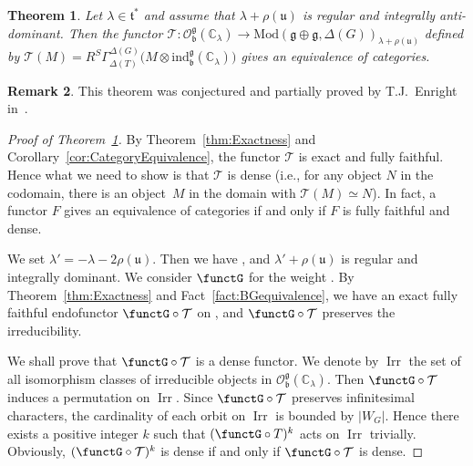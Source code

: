 \documentclass[10pt,a4paper]{amsart}
\numberwithin{equation}{section}
\newtheorem{Theorem}{Theorem}[section]
\theoremstyle{definition}
\newtheorem{Remark}[Theorem]{Remark}
\newcommand{\BasicRing}[1]{\mathbb{#1}}
\newcommand{\CC}{\BasicRing{C}}
\newcommand{\Mod}{\mathrm{Mod}}
\newcommand{\lieC}[1]{\mathfrak{#1}}
\newcommand{\lie}[1]{\mathfrak{#1}}
\newcommand{\ind}[2]{\mathrm{ind}^{\lieC{#1}}_{\lieC{#2}}}
\newcommand{\BGGcat}[2]{\mathcal{O}_{\lie{#2}}^{\lie{#1}}}
\newcommand{\zuck}[2]{\Gamma^{#1}_{#2}}
\newcommand{\Dzuck}[3]{R^{#3}\zuck{#1}{#2}}
\newcommand{\rhog}[1]{\rho(#1)}
\DeclareMathOperator{\Irr}{\mathrm{Irr}}
\begin{document}
\begin{Theorem}\label{thm:CategoryEquivalence}
	Let $\lambda \in \lie{t}^*$ and assume that $\lambda + \rhog{\lie{u}}$ is regular and integrally anti-dominant.
	Then the functor $\mathcal{T}\colon \BGGcat{g}{b}(\CC_{\lambda}) \rightarrow \Mod(\lie{g\oplus g}, \Delta(G))_{\lambda+\rhog{\lie{u}}}$
	defined by $\mathcal{T}(M) = \Dzuck{\Delta(G)}{\Delta(T)}{S}\bigl(M \otimes \ind{g}{b}(\CC_{\lambda})\bigr)$ gives an equivalence of categories.
\end{Theorem}

\begin{Remark}
	This theorem was conjectured and partially proved by T.J.~Enright in~\cite{En81_lecture}.
\end{Remark}

\begin{proof}[Proof of Theorem~\ref{thm:CategoryEquivalence}]
	By Theorem~\ref{thm:Exactness} and Corollary~\ref{cor:CategoryEquivalence}, the functor $\mathcal{T}$ is exact and fully faithful.
	Hence what we need to show is that $\mathcal{T}$ is dense (i.e., for any object $N$ in the codomain,
	there is an object~$M$ in the domain with $\mathcal{T}(M) \simeq N$).
	In fact, a functor $F$ gives an equivalence of categories if and only if $F$ is fully faithful and dense.

	We set $\lambda'=-\lambda-2\rhog{\lie{u}}$.
	Then we have \smash{$\BGGcat{g}{b}(\CC_{-\lambda'})=\BGGcat{g}{b}(\CC_{\lambda})$},
	and $\lambda' + \rhog{\lie{u}}$ is regular and integrally dominant.
	We consider $\functG$ for the weight .
	By Theorem~\ref{thm:Exactness} and Fact~\ref{fact:BGequivalence},
	we have an exact fully faithful endofunctor $\functG\circ \mathcal{T}$ on \smash{$\BGGcat{g}{b}(\CC_\lambda)$},
	and $\functG\circ \mathcal{T}$ preserves the irreducibility.

	We shall prove that $\functG\circ \mathcal{T}$ is a dense functor.
	We denote by $\Irr$ the set of all isomorphism classes of irreducible objects in $\BGGcat{g}{b}(\CC_\lambda)$.
	Then $\functG \circ \mathcal{T}$ induces a permutation on $\Irr$.
	Since $\functG\circ \mathcal{T}$ preserves infinitesimal characters,
	the cardinality of each orbit on $\Irr$ is bounded by $|W_G|$.
	Hence there exists a positive integer $k$ such that $(\functG\circ T)^k$ acts on $\Irr$ trivially.
	Obviously, $(\functG\circ \mathcal{T})^k$ is dense if and only if $\functG\circ \mathcal{T}$ is dense.


\end{proof}
\end{document}
